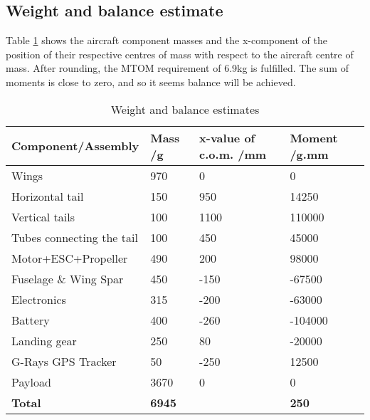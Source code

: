 \subsection{Weight and balance estimate}
Table \ref{tab:weights} shows the aircraft component masses and the x-component of the position of their respective centres of mass with respect to the aircraft centre of mass. After rounding, the MTOM requirement of 6.9kg is fulfilled. The sum of moments is close to zero, and so it seems balance will be achieved.
\begin{table}[H]
	\centering
	\begin{tabularx}{\textwidth}{X|>{\hfill}p{}|>{\hfill}p{}|>{\hfill}p{}}
		\textbf{Component/Assembly} & \textbf{Mass /g} & \textbf{x-value of c.o.m. /mm} & \textbf{Moment /g.mm}\\ \hline
		Wings & 970 & 0 & 0 \\ \hline
		Horizontal tail & 150 & 950 & 14250 \\ \hline
		Vertical tails & 100 & 1100 & 110000 \\ \hline
		Tubes connecting the tail & 100 & 450 & 45000\\ \hline
		Motor+ESC+Propeller & 490 & 200 & 98000 \\ \hline
		Fuselage \& Wing Spar & 450 & -150 & -67500 \\ \hline
		Electronics & 315 & -200 & -63000 \\ \hline
		Battery & 400 & -260 & -104000 \\ \hline
		Landing gear & 250 & 80 & -20000 \\ \hline
		G-Rays GPS Tracker & 50 & -250 & 12500 \\ \hline
		Payload & 3670 & 0 & 0 \\ \hline
		\textbf{Total} & \textbf{6945} & & \textbf{250} \\
	\end{tabularx}
	\caption{Weight and balance estimates}
	\label{tab:weights}
\end{table}

